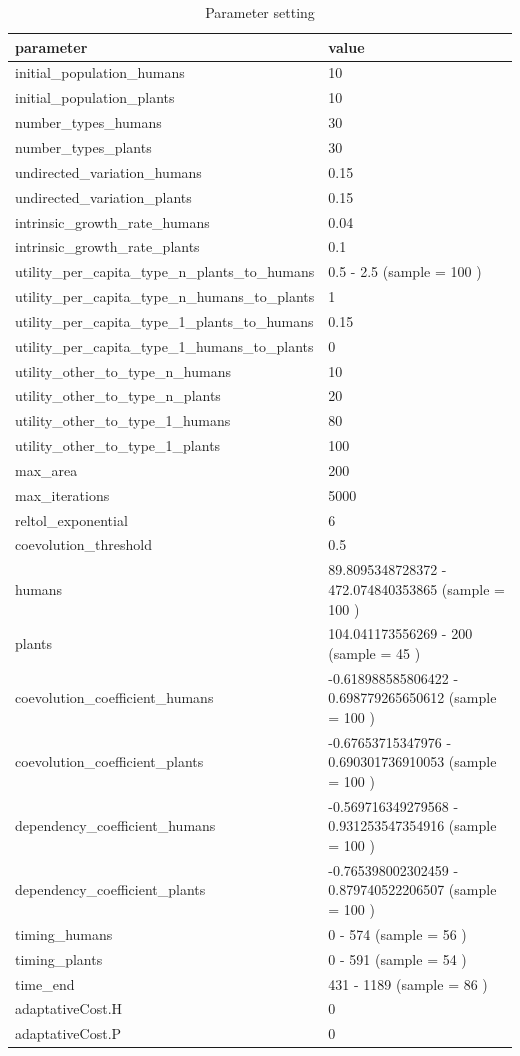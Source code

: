 \documentclass[
]{book}
\begin{document}
\begin{table}[!h]

\caption{\label{tab:2mUPnHtablepdf}Parameter setting}
\centering
\begin{tabular}[t]{l|l}
\hline
parameter & value\\
\hline
initial\_population\_humans & 10\\
\hline
initial\_population\_plants & 10\\
\hline
number\_types\_humans & 30\\
\hline
number\_types\_plants & 30\\
\hline
undirected\_variation\_humans & 0.15\\
\hline
undirected\_variation\_plants & 0.15\\
\hline
intrinsic\_growth\_rate\_humans & 0.04\\
\hline
intrinsic\_growth\_rate\_plants & 0.1\\
\hline
utility\_per\_capita\_type\_n\_plants\_to\_humans & 0.5 - 2.5 (sample = 100 )\\
\hline
utility\_per\_capita\_type\_n\_humans\_to\_plants & 1\\
\hline
utility\_per\_capita\_type\_1\_plants\_to\_humans & 0.15\\
\hline
utility\_per\_capita\_type\_1\_humans\_to\_plants & 0\\
\hline
utility\_other\_to\_type\_n\_humans & 10\\
\hline
utility\_other\_to\_type\_n\_plants & 20\\
\hline
utility\_other\_to\_type\_1\_humans & 80\\
\hline
utility\_other\_to\_type\_1\_plants & 100\\
\hline
max\_area & 200\\
\hline
max\_iterations & 5000\\
\hline
reltol\_exponential & 6\\
\hline
coevolution\_threshold & 0.5\\
\hline
humans & 89.8095348728372 - 472.074840353865 (sample = 100 )\\
\hline
plants & 104.041173556269 - 200 (sample = 45 )\\
\hline
coevolution\_coefficient\_humans & -0.618988585806422 - 0.698779265650612 (sample = 100 )\\
\hline
coevolution\_coefficient\_plants & -0.67653715347976 - 0.690301736910053 (sample = 100 )\\
\hline
dependency\_coefficient\_humans & -0.569716349279568 - 0.931253547354916 (sample = 100 )\\
\hline
dependency\_coefficient\_plants & -0.765398002302459 - 0.879740522206507 (sample = 100 )\\
\hline
timing\_humans & 0 - 574 (sample = 56 )\\
\hline
timing\_plants & 0 - 591 (sample = 54 )\\
\hline
time\_end & 431 - 1189 (sample = 86 )\\
\hline
adaptativeCost.H & 0\\
\hline
adaptativeCost.P & 0\\
\hline
\end{tabular}
\end{table}
\end{document}
